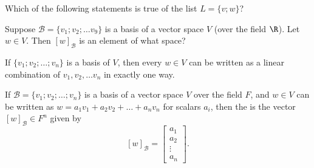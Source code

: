 Which of the following statements is true of the list $L = \{v; w\}$?  



\edXsolution{
  
}

\endedxproblem


\endedxvertical









Suppose $\mathcal{B} = \{v_1; v_2; \ldots v_9\}$ is a basis of a vector space $V$ (over the field $\R$).  Let $w \in V$.  Then  $[w]_{\mathcal{B}}$ is an element of what space?  




\endedxproblem

\endedxvertical





{}  If $\{v_1; v_2; \ldots ; v_n\}$ is a basis of $V$, then every $w\in V$
can be written as a linear combination of $v_1, v_2, \ldots v_n$ in exactly one way.  


{} If  $\mathcal{B} = \{v_1; v_2; \ldots ; v_n\}$ is a basis of a vector space $V$ over the field $F$, and 
$w\in V$ can be written as $w = a_1v_1 + a_2v_2 + \ldots + a_n v_n$ for scalars $a_i$, then 
the {} is the vector $[w]_{\mathcal{B}} \in F^n$
given by 
\[ [w]_{\mathcal{B}} = \left[ \begin{array}{c} a_1 \\ a_2 \\ \vdots \\ a_n \end{array} \right]. \]

